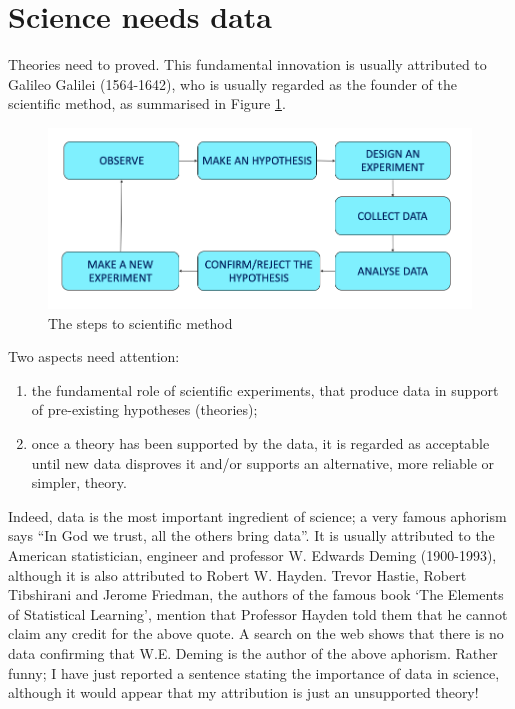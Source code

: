 \documentclass[a4paper,12pt,oneside]{book}
\providecommand{\tightlist}{%
  \setlength{\itemsep}{0pt}\setlength{\parskip}{0pt}}
\begin{document}
\hypertarget{science-needs-data}{%
\section{Science needs data}\label{science-needs-data}}

Theories need to proved. This fundamental innovation is usually attributed to Galileo Galilei (1564-1642), who is usually regarded as the founder of the scientific method, as summarised in Figure \ref{fig:figName11}.

\begin{figure}

{\centering \includegraphics[width=0.75\linewidth]{_images/MSAMap} 

}

\caption{The steps to scientific method}\label{fig:figName11}
\end{figure}

Two aspects need attention:

\begin{enumerate}
\def\labelenumi{\arabic{enumi}.}
\tightlist
\item
  the fundamental role of scientific experiments, that produce data in support of pre-existing hypotheses (theories);
\item
  once a theory has been supported by the data, it is regarded as acceptable until new data disproves it and/or supports an alternative, more reliable or simpler, theory.
\end{enumerate}

Indeed, data is the most important ingredient of science; a very famous aphorism says ``In God we trust, all the others bring data''. It is usually attributed to the American statistician, engineer and professor W. Edwards Deming (1900-1993), although it is also attributed to Robert W. Hayden. Trevor Hastie, Robert Tibshirani and Jerome Friedman, the authors of the famous book `The Elements of Statistical Learning', mention that Professor Hayden told them that he cannot claim any credit for the above quote. A search on the web shows that there is no data confirming that W.E. Deming is the author of the above aphorism. Rather funny; I have just reported a sentence stating the importance of data in science, although it would appear that my attribution is just an unsupported theory!
\end{document}
